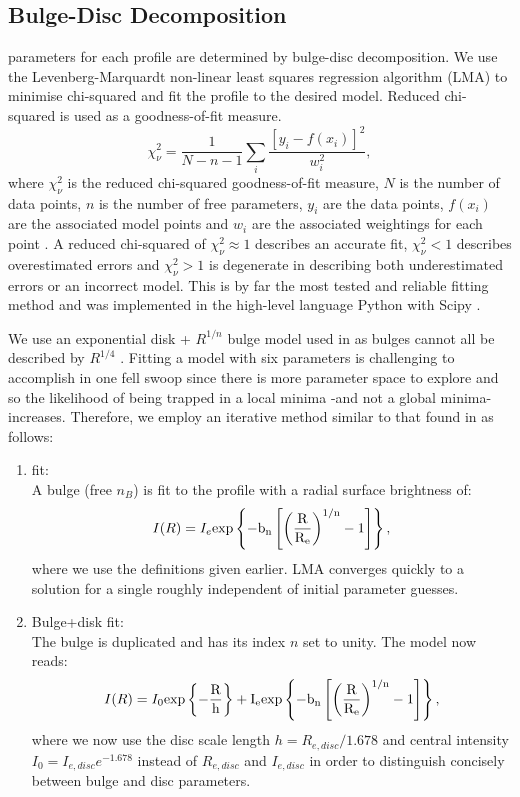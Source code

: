 \subsection{Bulge-Disc Decomposition}
\sersic parameters for each profile are determined by bulge-disc decomposition. We use the Levenberg-Marquardt non-linear least squares regression algorithm (LMA) to minimise chi-squared and fit the profile to the desired model. Reduced chi-squared is used as a goodness-of-fit measure.
\begin{equation}
	\chi^{2}_{\nu} = \frac{1}{N-n-1} \sum_{i} \frac{[y_i - f(x_i)]^2}{w_i^2},
\end{equation}
where $\chi_{\nu}^2$ is the reduced chi-squared goodness-of-fit measure, $N$ is the number of data points, $n$ is the number of free parameters, $y_i$ are the data points, $f(x_i)$ are the associated model points and $w_i$ are the associated weightings for each point \citep{marquardt_algorithm_1963}. A reduced chi-squared of $\chi_{\nu}^2 \approx 1$ describes an accurate fit, $\chi_{\nu}^2<1$ describes overestimated errors and $\chi_{\nu}^2>1$ is degenerate in describing both underestimated errors or an incorrect model. This is by far the most tested and reliable fitting method \citep{lawson_solving_1995} and was implemented in the high-level language Python with Scipy \citep{oliphant_python_2007}. 

We use an exponential disk + \sersic $R^{1/n}$ bulge model used in \citet{allen_millennium_2006} as bulges cannot all be described by $R^{1/4}$ \citep{simard_catalog_2011}. Fitting a model with six parameters is challenging to accomplish in one fell swoop since there is more parameter space to explore and so the likelihood of being trapped in a local minima -and not a global minima- increases. Therefore, we employ an iterative method similar to that found in \citet{weinzirl_bulge_2009} as follows:

\begin{enumerate}
	\item \sersic fit: \\
	A \sersic bulge (free $n_B$) is fit to the profile with a radial surface brightness of:
	\begin{equation}
		I(R) = I_{e} \rm{exp}\left\{-b_{n}\left[\left(\frac{R}{R_{e}}\right)^{1/n} - 1\right]\right\},
	\end{equation}
	where we use the definitions given earlier.	LMA converges quickly to a solution for a single \sersic roughly independent of initial parameter guesses. 

	\item Bulge+disk fit: \\
	The \sersic bulge is duplicated and has its \sersic index $n$ set to unity. The model now reads:
	\begin{equation}
		I(R) = I_0 \rm{exp}\left\{-\frac{R}{h}\right\} + I_{e} \rm{exp}\left\{-b_{n}\left[\left(\frac{R}{R_{e}}\right)^{1/n} - 1\right]\right\},
	\end{equation}
	where we now use the disc scale length $h=R_{e,disc}/1.678$ and central intensity $I_0=I_{e,disc}e^{-1.678}$ instead of $R_{e,disc}$ and $I_{e,disc}$ in order to distinguish concisely between bulge and disc parameters. 
\end{enumerate}

